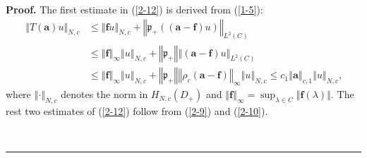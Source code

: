 \documentclass[a4paper]{article}%
\newenvironment{proof}[1][Proof]{\noindent\textbf{#1.} }{\ \rule{0.5em}{0.5em}}
\begin{document}
\begin{proof}
The first estimate in (\ref{2-12}) is derived from (\ref{1-5}):%
\begin{align*}
\left\Vert T\left(  \boldsymbol{a}\right)  u\right\Vert _{N,c}  &
\leq\left\Vert \boldsymbol{f}u\right\Vert _{N,c}+\left\Vert \mathfrak{p}%
_{+}\left(  \left(  \boldsymbol{a}-\boldsymbol{f}\right)  u\right)
\right\Vert _{L^{2}\left(  C\right)  }\\
&  \leq\left\Vert \boldsymbol{f}\right\Vert _{\infty}\left\Vert u\right\Vert
_{N,c}+\left\Vert \mathfrak{p}_{+}\right\Vert \left\Vert \left(
\boldsymbol{a}-\boldsymbol{f}\right)  u\right\Vert _{L^{2}\left(  C\right)
}\text{\ }\\
&  \leq\left\Vert \boldsymbol{f}\right\Vert _{\infty}\left\Vert u\right\Vert
_{N,c}+\left\Vert \mathfrak{p}_{+}\right\Vert \left\Vert \rho_{c}\left(
\boldsymbol{a}-\boldsymbol{f}\right)  \right\Vert _{\infty}\left\Vert
u\right\Vert _{N,c}\leq c_{1}\left\Vert \boldsymbol{a}\right\Vert
_{c,1}\left\Vert u\right\Vert _{N,c}\text{,}%
\end{align*}
where $\left\Vert \cdot\right\Vert _{N,c}$ denotes the norm in $H_{N,c}\left(
D_{+}\right)  $ and $\left\Vert \boldsymbol{f}\right\Vert _{\infty}%
=\sup_{\lambda\in C}\left\Vert \boldsymbol{f}\left(  \lambda\right)
\right\Vert $. The rest two estimates of (\ref{2-12}) follow from (\ref{2-9})
and (\ref{2-10}).


\end{proof}
\end{document}
